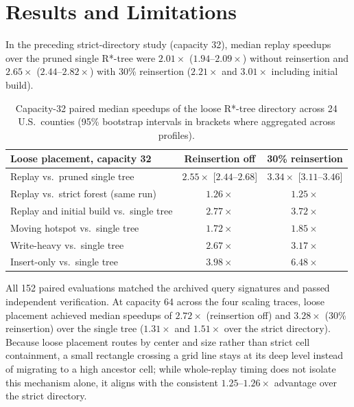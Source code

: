\documentclass[10pt,letterpaper]{article}
\begin{document}
\section{Results and Limitations}

In the preceding strict-directory study (capacity 32), median replay speedups over the pruned single R*-tree were $2.01\times$ ($1.94\text{--}2.09\times$) without reinsertion and $2.65\times$ ($2.44\text{--}2.82\times$) with 30\% reinsertion ($2.21\times$ and $3.01\times$ including initial build).

\begin{table}[ht]
\centering
\small
\caption{Capacity-32 paired median speedups of the loose R*-tree directory across 24 U.S.\ counties (95\% bootstrap intervals in brackets where aggregated across profiles).}
\label{tab:spatial}
\begin{tabularx}{\linewidth}{>{\raggedright\arraybackslash}Xcc}
\toprule
\textbf{Loose placement, capacity 32} & \textbf{Reinsertion off} & \textbf{30\% reinsertion} \\
\midrule
Replay vs.\ pruned single tree & $2.55\times$ [$2.44\text{--}2.68$] & $3.34\times$ [$3.11\text{--}3.46$] \\
Replay vs.\ strict forest (same run) & $1.26\times$ & $1.25\times$ \\
Replay and initial build vs.\ single tree & $2.77\times$ & $3.72\times$ \\
Moving hotspot vs.\ single tree & $1.72\times$ & $1.85\times$ \\
Write-heavy vs.\ single tree & $2.67\times$ & $3.17\times$ \\
Insert-only vs.\ single tree & $3.98\times$ & $6.48\times$ \\
\bottomrule
\end{tabularx}
\end{table}

All 152 paired evaluations matched the archived query signatures and passed independent verification. At capacity 64 across the four scaling traces, loose placement achieved median speedups of $2.72\times$ (reinsertion off) and $3.28\times$ (30\% reinsertion) over the single tree ($1.31\times$ and $1.51\times$ over the strict directory). Because loose placement routes by center and size rather than strict cell containment, a small rectangle crossing a grid line stays at its deep level instead of migrating to a high ancestor cell; while whole-replay timing does not isolate this mechanism alone, it aligns with the consistent $1.25\text{--}1.26\times$ advantage over the strict directory.
\end{document}

